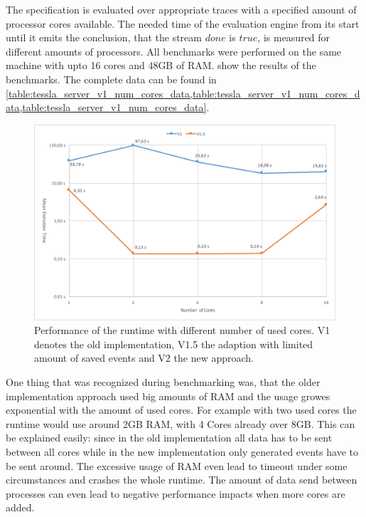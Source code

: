 The specification is evaluated over appropriate traces with a specified amount of processor cores available.
The needed time of the evaluation engine from its start until it emits the conclusion, that the stream \(\mathit{done}\) is \(\mathit{true}\), is measured for different amounts of processors.
All benchmarks were performed on the same machine  with upto 16 cores and 48GB of RAM.
 show the results of the benchmarks.
The complete data can be found in \cref{table:tessla_server_v1_num_cores_data,table:tessla_server_v1_num_cores_data,table:tessla_server_v1_num_cores_data}.

\begin{figure}
  \includegraphics[angle=90,origin=c,width=\textwidth]{gfx/runtime_num_cores_benchmark}
  \caption[Performance of the runtime with different number of used cores]{Performance of the runtime with different number of used cores. V1 denotes the old implementation, V1.5 the adaption with limited amount of saved events and V2 the new approach.}
\label{fig:chap_eval:runtime_num_cores}
\end{figure}

One thing that was recognized during benchmarking was, that the older implementation approach used big amounts of RAM and the usage growes exponential with the amount of used cores.
For example with two used cores the runtime would use around 2GB RAM, with 4 Cores already over 8GB.
This can be explained easily: since in the old implementation all data has to be sent between all cores while in the new implementation only generated events have to be sent around.
The excessive usage of RAM even lead to timeout under some circumstances and crashes the whole runtime.
The amount of data send between processes can even lead to negative performance impacts when more cores are added.

